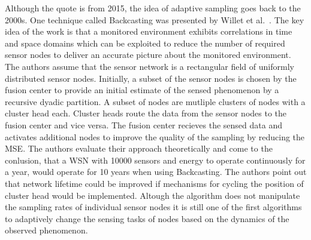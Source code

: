 
\par
Although the quote is from 2015, the idea of adaptive sampling goes back to the
2000s. One technique called Backcasting was presented by Willet et
al.~\cite{willett2004backcasting}. The key idea of the work is that a monitored
environment exhibits correlations in time and space domains which can be
exploited to reduce the number of required sensor nodes to deliver an accurate
picture about the monitored environment. The authors assume that the sensor
network is a rectangular field of uniformly distributed sensor nodes.
Initially, a subset of the sensor nodes is chosen by the fusion center to
provide an initial estimate of the sensed phenomenon by a recursive dyadic
partition. A subset of nodes are mutliple clusters of nodes with a cluster head
each. Cluster heads route the data from the sensor nodes to the fusion center
and vice versa. The fusion center recieves the sensed data and activates
additional nodes to improve the quality of the sampling by reducing the
\ac{MSE}. The authors evaluate their approach theoretically and come to the
conlusion, that a \ac{WSN} with 10000 sensors and energy to operate
continuously for a year, would operate for 10 years when using Backcasting. The
authors point out that network lifetime could be improved if mechanisms for
cycling the position of cluster head would be implemented. Altough the
algorithm does not manipulate the sampling rates of individual sensor nodes it
is still one of the first algorithms to adaptively change the sensing tasks of
nodes based on the dynamics of the observed phenomenon.

\par

